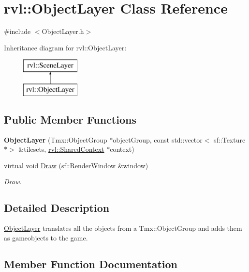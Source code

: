 \hypertarget{classrvl_1_1_object_layer}{}\section{rvl\+:\+:Object\+Layer Class Reference}
\label{classrvl_1_1_object_layer}


{\ttfamily \#include $<$Object\+Layer.\+h$>$}

Inheritance diagram for rvl\+:\+:Object\+Layer\+:\begin{figure}[H]
\begin{center}
\leavevmode
\includegraphics[height=2.000000cm]{classrvl_1_1_object_layer}
\end{center}
\end{figure}
\subsection*{Public Member Functions}
\begin{DoxyCompactItemize}
\item 
\mbox{\label{classrvl_1_1_object_layer_a653283acf3afa9b685f3f888f8670a83}} 
{\bfseries Object\+Layer} (Tmx\+::\+Object\+Group $\ast$object\+Group, const std\+::vector$<$ sf\+::\+Texture $\ast$$>$ \&tilesets, \hyperlink{structrvl_1_1_shared_context}{rvl\+::\+Shared\+Context} $\ast$context)
\item 
virtual void \hyperlink{classrvl_1_1_object_layer_a3b29bd63ae4233eba84817bfe9eecae9}{Draw} (sf\+::\+Render\+Window \&window)
\begin{DoxyCompactList}\small\item\em Draw. \end{DoxyCompactList}\end{DoxyCompactItemize}


\subsection{Detailed Description}
\hyperlink{classrvl_1_1_object_layer}{Object\+Layer} translates all the objects from a Tmx\+::\+Object\+Group and adds them as gameobjects to the game. 

\subsection{Member Function Documentation}
\mbox{\label{classrvl_1_1_object_layer_a3b29bd63ae4233eba84817bfe9eecae9}} 
